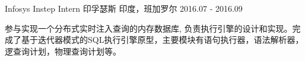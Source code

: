 \begin{cventries}
  \cventry
    {Infosys Instep Intern}
    {印孚瑟斯}
    {印度，班加罗尔}
    {2016.07 - 2016.09}
    {
      \begin{cvitems}
        \item {参与实现一个分布式实时注入查询的内存数据库, 负责执行引擎的设计和实现。完成了基于迭代器模式的SQL执行引擎原型，主要模块有语句执行器，语法解析器，逻查询计划，物理查询计划等。}
      \end{cvitems}
    }
\end{cventries}


